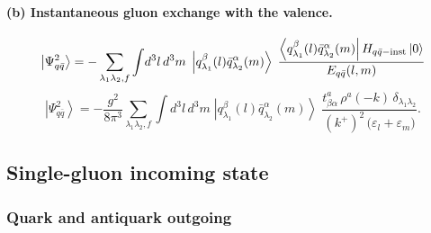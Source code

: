 \documentclass[11pt]{article}
\newcommand{\ibar}[2]{\draw[line width=1.1pt] (#1-0.13,#2) -- (#1+0.13,#2);}
\newcommand{\eps}{\varepsilon}
\newcommand{\ket}[1]{\left|#1\right\rangle}
\newcommand{\bra}[1]{\left\langle#1\right|}
\newcommand{\vac}{\ket{0}}
\newcommand{\qk}[3]{q^{#1}_{#2}(#3)}
\newcommand{\aqk}[3]{\bar q^{#1}_{#2}(#3)}
\begin{document}
\paragraph{(b) Instantaneous gluon exchange with the valence.}
\begin{center}
\end{center}
\begin{equation}
\ket{\Psi^{2}_{q\bar q}}=-\sum_{\lambda_{1}\lambda_{2},f}\int\! d^{3}l\,d^{3}m\;
\ket{\qk{\beta}{\lambda_{1}}{l}\aqk{\alpha}{\lambda_{2}}{m}}\;
\frac{\bra{\qk{\beta}{\lambda_{1}}{l}\aqk{\alpha}{\lambda_{2}}{m}}H_{q\bar q-\rm inst}\vac}
{E_{q\bar q}(l,m)}
\end{equation}
\begin{equation}
\ket{\Psi^{2}_{q\bar q}}=-\frac{g^{2}}{8\pi^{3}}\sum_{\lambda_{1}\lambda_{2},f}\int\!d^{3}l\,d^{3}m\;
\ket{\qk{\beta}{\lambda_{1}}{l}\aqk{\alpha}{\lambda_{2}}{m}}\;
\frac{t^{a}_{\beta\alpha}\,\rho^{a}(-k)\,\delta_{\lambda_{1}\lambda_{2}}}
{(k^{+})^{2}\,\big(\eps_{l}+\eps_{m}\big)} .
\label{eq:P2}
\end{equation}

\subsection{Single-gluon incoming state}
\subsubsection{Quark and antiquark outgoing}
\end{document}
